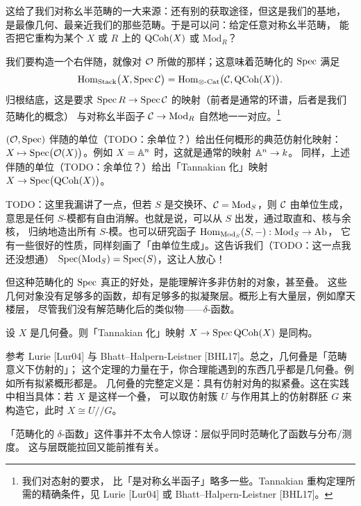 这给了我们对称幺半范畴的一大来源：还有别的获取途径，但这是我们的基地，
是最像几何、最亲近我们的那些范畴。于是可以问：给定任意对称幺半范畴，
能否把它重构为某个 $X$ 或 $R$ 上的 $\mathrm{QCoh}(X)$ 或 $\mathrm{Mod}_R$？

我们要构造一个右伴随，就像对 $\mathcal{O}$ 所做的那样；这意味着范畴化的 $\operatorname{Spec}$ 满足
\[
\operatorname{Hom}_{\mathrm{Stack}}\bigl(X,\operatorname{Spec}\mathcal{C}\bigr)
=\operatorname{Hom}_{\otimes\text{-}\mathrm{Cat}}\bigl(\mathcal{C},\mathrm{QCoh}(X)\bigr).
\]
归根结底，这是要求 $\operatorname{Spec} R\to\operatorname{Spec}\mathcal{C}$ 的映射（前者是通常的环谱，后者是我们范畴化的概念）
与对称幺半函子 $\mathcal{C}\to\mathrm{Mod}_R$ 自然地一一对应。\footnote{我们对态射的要求，
比「是对称幺半函子」略多一些。Tannakian 重构定理所需的精确条件，见 Lurie [Lur04]
或 Bhatt–Halpern-Leistner [BHL17]。}

$(\mathcal{O},\operatorname{Spec})$ 伴随的单位（TODO：余单位？）给出任何概形的典范仿射化映射：
$X\mapsto\operatorname{Spec}\bigl(\mathcal{O}(X)\bigr)$。例如 $X=\mathbb{A}^n$ 时，这就是通常的映射 $\mathbb{A}^n\to k$。
同样，上述伴随的单位（TODO：余单位？）给出「Tannakian 化」映射
$X\to\operatorname{Spec}\bigl(\mathrm{QCoh}(X)\bigr)$。

TODO：这里我漏讲了一点，但若 $S$ 是交换环、$\mathcal{C}=\mathrm{Mod}_S$，则 $\mathcal{C}$ 由单位生成，
意思是任何 $S$-模都有自由消解。也就是说，可以从 $S$ 出发，通过取直和、核与余核，
归纳地造出所有 $S$-模。也可以研究函子 $\operatorname{Hom}_{\mathrm{Mod}_S}(S,-):\mathrm{Mod}_S\to\mathrm{Ab}$，
它有一些很好的性质，同样刻画了「由单位生成」。这告诉我们（TODO：这一点我还没想通）
$\operatorname{Spec}(\mathrm{Mod}_S)=\operatorname{Spec}(S)$，这让人放心！

但这种范畴化的 $\operatorname{Spec}$ 真正的好处，是能理解许多非仿射的对象，甚至叠。
这些几何对象没有足够多的函数，却有足够多的拟凝聚层。概形上有大量层，例如摩天楼层，
尽管我们没有解范畴化后的类似物——$\delta$-函数。

\begin{theorem}[Tannakian 重构]
设 $X$ 是几何叠。则「Tannakian 化」映射 $X\to\operatorname{Spec}\mathrm{QCoh}(X)$ 是同构。
\end{theorem}

参考 Lurie [Lur04] 与 Bhatt–Halpern-Leistner [BHL17]。总之，几何叠是「范畴意义下仿射的」；
这个定理的力量在于，你合理能遇到的东西几乎都是几何叠。例如所有拟紧概形都是。
几何叠的完整定义是：具有仿射对角的拟紧叠。这在实践中相当具体：若 $X$ 是这样一个叠，
可以取仿射簇 $U$ 与作用其上的仿射群胚 $G$ 来构造它，此时 $X\cong U/\!/G$。

\begin{remark}
「范畴化的 $\delta$-函数」这件事并不太令人惊讶：层似乎同时范畴化了函数与分布/测度。
这与层既能拉回又能前推有关。
\end{remark}

